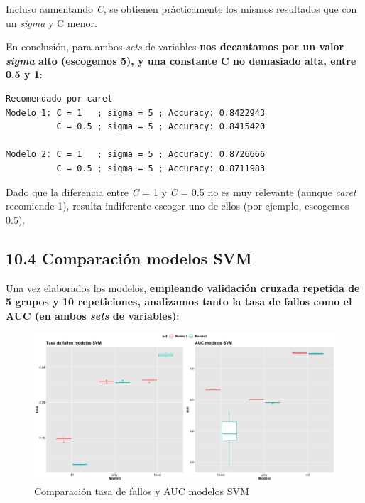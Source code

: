 \documentclass[
]{article}
\begin{document}
Incluso aumentando \emph{C}, se obtienen prácticamente los mismos
resultados que con un \emph{sigma} y C menor.

En conclusión, para ambos \emph{sets} de variables \textbf{nos
decantamos por un valor \emph{sigma} alto (escogemos 5), y una constante
C no demasiado alta, entre 0.5 y 1}:

\begin{verbatim}
Recomendado por caret
Modelo 1: C = 1   ; sigma = 5 ; Accuracy: 0.8422943
          C = 0.5 ; sigma = 5 ; Accuracy: 0.8415420

Modelo 2: C = 1   ; sigma = 5 ; Accuracy: 0.8726666
          C = 0.5 ; sigma = 5 ; Accuracy: 0.8711983
\end{verbatim}

Dado que la diferencia entre \emph{C} = 1 y \emph{C} = 0.5 no es muy
relevante (aunque \emph{caret} recomiende 1), resulta indiferente
escoger uno de ellos (por ejemplo, escogemos 0.5).

\hypertarget{comparaciuxf3n-modelos-svm}{%
\subsection{10.4 Comparación modelos
SVM}\label{comparaciuxf3n-modelos-svm}}

Una vez elaborados los modelos, \textbf{empleando validación cruzada
repetida de 5 grupos y 10 repeticiones, analizamos tanto la tasa de
fallos como el AUC (en ambos \emph{sets} de variables)}:

\begin{figure}[h!]

{\centering \includegraphics[width=0.99\linewidth,height=0.99\textheight,]{./charts/SVM/comparacion_svm} 

}

\caption{Comparación tasa de fallos y AUC modelos SVM}\label{fig:unnamed-chunk-124}
\end{figure}
\end{document}
